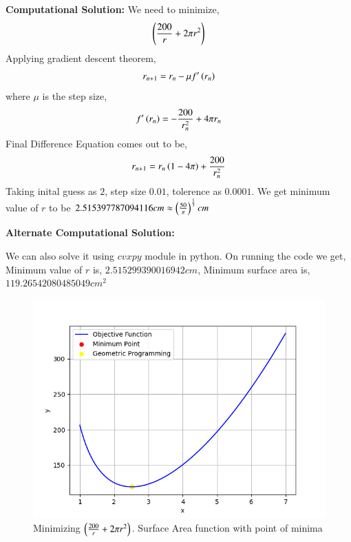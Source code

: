 \documentclass[journal]{IEEEtran}
\begin{document}
\textbf{Computational Solution:}\newline
We need to minimize,
\begin{align}
  \left(\frac{200}{r} + 2\pi r^2\right)
\end{align}
Applying gradient descent theorem,
\begin{align}
  r_{n+1} = r_n -\mu f^{\prime}\left(r_n\right)\\
\end{align}
where $\mu$ is the step size,
\begin{align}
  f^{\prime}\left(r_n\right) = -\frac{200}{r_n^2} +4\pi r_n
\end{align}
Final Difference Equation comes out to be, 
\begin{align}
  r_{n+1} = r_n\left(1 - 4\pi\right) + \frac{200}{r_n^2} 
\end{align}
Taking inital guess as $2$, step size $0.01$, tolerence as $0.0001$.\newline
We get minimum value of $r$ to be $2.515397787094116 cm \approx \left(\frac{50}{\pi}\right)^{\frac{1}{3}} cm$

\textbf{Alternate Computational Solution: }\newline

We can also solve it using $cvxpy$ module in python. On running the code we get,\newline
Minimum value of $r$ is, $2.515299390016942 cm$, Minimum surface area is, $ 119.26542080485049 cm^2$

\begin{figure}[h!]
   \centering
   \includegraphics[width=1\columnwidth]{figs/fig.png}
   \caption{Minimizing $\left(\frac{200}{r} + 2\pi r^2\right)$. Surface Area function with point of minima}
   \label{stemplot}
\end{figure}
\end{document}
